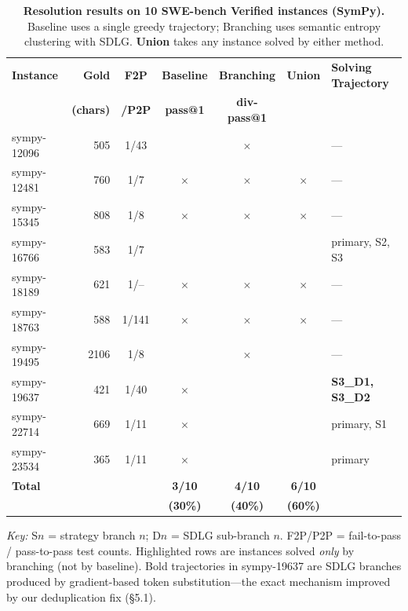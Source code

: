 \documentclass[11pt]{article}
\newcommand{\cmark}{\textcolor{green!60!black}{\checkmark}}
\newcommand{\xmark}{\textcolor{red!70!black}{$\times$}}
\begin{document}
\begin{table}[h]
\centering
\caption{\textbf{Resolution results on 10 SWE-bench Verified instances (SymPy).} Baseline uses a single greedy trajectory; Branching uses semantic entropy clustering with SDLG. \textbf{Union} takes any instance solved by either method.}
\label{tab:main-results}
\small
\begin{tabular}{@{}lrccccl@{}}
\toprule
\textbf{Instance} & \textbf{Gold} & \textbf{F2P} & \textbf{Baseline} & \textbf{Branching} & \textbf{Union} & \textbf{Solving Trajectory} \\
 & \textbf{(chars)} & \textbf{/P2P} & \textbf{pass@1} & \textbf{div-pass@1} & & \\
\midrule
sympy-12096  & 505  & 1/43  & \cmark & \xmark & \cmark & --- \\
sympy-12481  & 760  & 1/7   & \xmark & \xmark & \xmark & --- \\
sympy-15345  & 808  & 1/8   & \xmark & \xmark & \xmark & --- \\
sympy-16766  & 583  & 1/7   & \cmark & \cmark & \cmark & primary, S2, S3 \\
sympy-18189  & 621  & 1/--  & \xmark & \xmark & \xmark & --- \\
sympy-18763  & 588  & 1/141 & \xmark & \xmark & \xmark & --- \\
sympy-19495  & 2106 & 1/8   & \cmark & \xmark & \cmark & --- \\
\rowcolor{blue!5}
sympy-19637  & 421  & 1/40  & \xmark & \cmark & \cmark & \textbf{S3\_D1, S3\_D2} \\
\rowcolor{blue!5}
sympy-22714  & 669  & 1/11  & \xmark & \cmark & \cmark & primary, S1 \\
\rowcolor{blue!5}
sympy-23534  & 365  & 1/11  & \xmark & \cmark & \cmark & primary \\
\midrule
\textbf{Total} & & & \textbf{3/10} & \textbf{4/10} & \textbf{6/10} & \\
 & & & \textbf{(30\%)} & \textbf{(40\%)} & \textbf{(60\%)} & \\
\bottomrule
\end{tabular}

\vspace{6pt}
{\footnotesize
\textit{Key:} S$n$ = strategy branch $n$; D$n$ = SDLG sub-branch $n$. F2P/P2P = fail-to-pass / pass-to-pass test counts. \colorbox{blue!5}{Highlighted rows} are instances solved \textit{only} by branching (not by baseline). Bold trajectories in sympy-19637 are SDLG branches produced by gradient-based token substitution---the exact mechanism improved by our deduplication fix (\S5.1).
}
\end{table}
\end{document}
